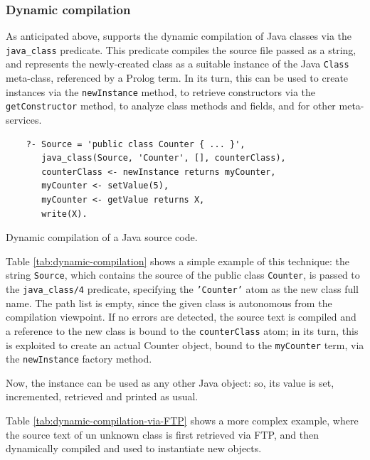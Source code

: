\subsubsection{Dynamic compilation}

As anticipated above, \tuprolog{} supports the dynamic compilation of Java classes via the \texttt{java\_class} predicate. This predicate compiles the source file passed as a string, and represents the newly-created class as a suitable instance of the Java \texttt{Class} meta-class, referenced by a Prolog term.
%
In its turn, this can be used to create instances via the \texttt{newInstance}
method, to retrieve constructors via the \texttt{getConstructor} method, to analyze class methods and fields, and for other meta-services.

\begin{table}
\begin{verbatim}
    ?- Source = 'public class Counter { ... }',
       java_class(Source, 'Counter', [], counterClass),
       counterClass <- newInstance returns myCounter,
       myCounter <- setValue(5),
       myCounter <- getValue returns X,
       write(X).
\end{verbatim}
\caption{Dynamic compilation of a Java source code.}
\label{tab:dynamic-compilation}
\end{table}

Table \ref{tab:dynamic-compilation} shows a simple example of this technique: the string \texttt{Source}, which contains the source of the public class \texttt{Counter}, is passed to the \texttt{java\_class/4} predicate, specifying the \texttt{'Counter'} atom as the new class full name. The path list is empty, since the given class is autonomous from the compilation viewpoint.
%
If no errors are detected, the source text is compiled and a reference to the new class is bound to the \texttt{counterClass} atom; in its turn, this is exploited to create an actual Counter object, bound to the \texttt{myCounter} term, via the \texttt{newInstance} factory method.

Now, the instance can be used as any other Java object: so, its value is set, incremented, retrieved and printed as usual.

Table \ref{tab:dynamic-compilation-via-FTP} shows a more complex example, where the source text of un unknown class is first retrieved via FTP, and then dynamically compiled and used to instantiate new objects.

